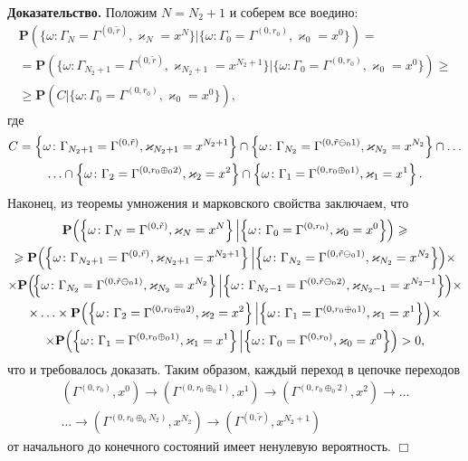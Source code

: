 \documentclass[12pt]{book}
\theoremstyle{plain}
\renewcommand{\Pr}{{\mathbf P}}
\theoremstyle{remark}
\theoremstyle{plain}
\theoremstyle{definition}
\renewenvironment{proof}{\indent\textbf{Доказательство. }}{\hfill$\Box$}
\begin{document}
\begin{proof}
Положим $N = N_2+1$ и соберем все воедино:
\begin{multline*}
\Pr(\{\omega\colon\Gamma_{N}=\Gamma^{(0,  \tilde{r} )},  \varkappa_{N}=x^N\}| \{\omega\colon
\Gamma_{0}=\Gamma^{(0,  r_0)},  \varkappa_{0}=x^0\}) = \\ =
\Pr(\{\omega\colon\Gamma_{N_2+1}=\Gamma^{(0,  \tilde{r} )},  \varkappa_{ N_2+1}=x^{N_2+1}\}|\{\omega\colon
\Gamma_{0}=\Gamma^{(0,  r_0)},  \varkappa_{0}=x^0\}) \geqslant \\ 
\geqslant
\Pr(C|\{\omega\colon\Gamma_{0}=\Gamma^{(0,  r_0)},  \varkappa_{0}=x^0\}), 
\end{multline*}
где 
\begin{multline*}
    C =\left\{\omega\colon\Gamma_{ N_2+1}=\Gamma^{(0,  \tilde{r} )},  \varkappa_{ N_2+1}=x^{N_2+1}\right\} \cap \left\{ \omega\colon \Gamma_{ N_2}=\Gamma^{(0,  \tilde{r} \ominus_0 1 )},  \varkappa_{N_2}=x^{N_2}\right\} \cap\ldots \Bigr.\\ \Bigl.
\ldots \cap \left\{\omega\colon\Gamma_{2}=\Gamma^{(0,  r_0\oplus_{0}2)}, \varkappa_{2}=x^2\right\} \cap \left\{\omega\colon \Gamma_{1}=\Gamma^{(0,  r_0\oplus_{0}1)}, \varkappa_{1}=x^1\right\}.
\end{multline*}
Наконец,  из теоремы умножения и марковского свойства заключаем,  что 
\begin{multline*}
\Pr\Bigl(\Bigl\{\omega\colon \Gamma_{N}=\Gamma^{(0, \tilde{r} )},  \varkappa_{N}=x^N\Bigr\} \,  \Big|\Bigl\{\omega\colon 
\Gamma_{0}=\Gamma^{(0,  r_0)},  \varkappa_{0}=x^0\Bigr\}\Bigr) \geqslant \\ 
\geqslant
\Pr\Bigl(\Bigl\{\omega\colon \Gamma_{N_2+1}=\Gamma^{(0,  \tilde{r} )},  \varkappa_{ N_2+1}=x^{N_2+1}\Bigr\}\,  \Big| \Bigl\{\omega\colon \Gamma_{ N_2}=\Gamma^{(0,  \tilde{r} \ominus_0 1 )},  \varkappa_{N_2}=x^{N_2}\Bigr\}\Bigr) \times 
%
\\ \times
\Pr\Bigl(\!\Bigl\{\omega\colon\Gamma_{ N_2}=\Gamma^{(0,  \tilde{r} \ominus_0 1 )},  \varkappa_{N_2}=x^{N_2}\Bigr\} \, \Big| \Bigl\{\omega\colon \Gamma_{ N_2-1}=\Gamma^{(0, \tilde{r} \ominus_0 2 )},  \varkappa_{N_2-1}=x^{N_2-1}\Bigr\}\Bigr) \times 
%
\\ \times \ldots
\times 
\Pr\Bigl(\Bigl\{\omega\colon\Gamma_{2}=\Gamma^{(0,  r_0\oplus_{0}2)}, \varkappa_{2}=x^2\Bigr\}\,  \Big|  \Bigl\{\omega\colon \Gamma_{1}=\Gamma^{(0,  r_0\oplus_{0}1)},  \varkappa_{1}=x^1\Bigr\}\Bigr) \times 
\\
\times
\Pr\Bigl(\Bigl\{\omega\colon\Gamma_{1}=\Gamma^{(0,  r_0\oplus_{0}1)},  \varkappa_{1}=x^1\Bigr\} \, \Big| \Bigl\{\omega\colon \Gamma_{0}=\Gamma^{(0,  r_0)},  \varkappa_{0}=x^0\Bigr\}\Bigr)>0, 
\end{multline*}
что и требовалось доказать. Таким образом,  каждый переход в цепочке переходов
\begin{multline*}
(\Gamma^{(0, r_0)}, x^0) \rightarrow (\Gamma^{(0, r_0\oplus_{0}1)}, x^1) \rightarrow (\Gamma^{(0, r_0\oplus_{0}2)},  x^2) \rightarrow \ldots \\ \ldots \rightarrow (\Gamma^{(0,  r_0\oplus_{0} N_2)},  x^{N_2})   \rightarrow (\Gamma^{(0,  \tilde{r})},  x^{N_2+1})
\end{multline*}
от начального до конечного состояний имеет ненулевую вероятность.
\end{proof}
\end{document}
